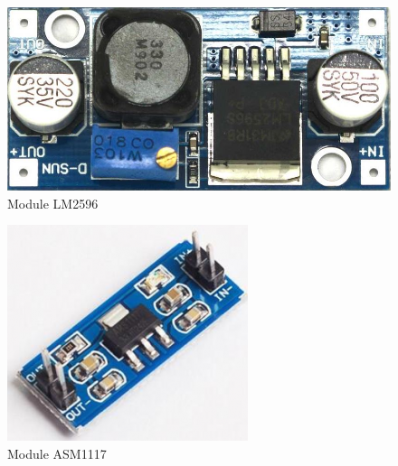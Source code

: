           \begin{figure}[!ht]
            \begin{center}
            \includegraphics[scale=0.6]{images/module-2596.jpg}
            \caption{Module LM2596}
            \label{fig:module2596}
            \end{center}
          \end{figure}
          \begin{figure}[!ht]
            \begin{center}
            \includegraphics[scale=1]{images/module1117.png}
            \caption{Module ASM1117}
            \label{fig:module1117}
            \end{center}
          \end{figure}

